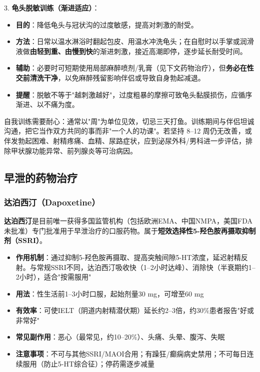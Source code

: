 \documentclass[12pt,a4paper,twoside]{ctexbook}
\begin{document}
3. \textbf{龟头脱敏训练（渐进适应）}：
  \begin{itemize}
  \item \textbf{目的}：降低龟头与冠状沟的过度敏感，提高对刺激的耐受。
  \item \textbf{方法}：日常以温水淋浴时翻起包皮、用温水冲洗龟头；在自慰时以手掌或润滑液做\textbf{由轻到重、由慢到快}的渐进刺激，接近高潮即停，逐步延长耐受时间。
  \item \textbf{辅助}：必要时可短期使用局部麻醉喷剂/乳膏（见下文药物治疗），但\textbf{务必在性交前清洗干净}，以免麻醉残留影响伴侣或导致自身勃起减退。
  \item \textbf{提醒}：脱敏不等于"越刺激越好"，过度粗暴的摩擦可致龟头黏膜损伤，应循序渐进、以不痛为度。
  \end{itemize}

\begin{tcolorbox}[colback=pink!5!white,colframe=red!50!black,title=贴心小叮咛]
自我训练需要耐心：通常以"周"为单位见效，切忌三天打鱼。训练期间与伴侣坦诚沟通，把它当作双方共同的事而非"一个人的功课"。若坚持 8--12 周仍无改善，或伴发勃起困难、射精疼痛、血精、尿路症状，应到泌尿外科/男科进一步评估，排除甲状腺功能异常、前列腺炎等可治病因。
\end{tcolorbox}

\subsection{早泄的药物治疗}

\subsubsection{达泊西汀（Dapoxetine）}

\textbf{达泊西汀}是目前唯一获得多国监管机构（包括欧洲EMA、中国NMPA，美国FDA未批准）专门批准用于早泄治疗的口服药物。属于\textbf{短效选择性5-羟色胺再摄取抑制剂（SSRI）}。

\begin{itemize}[leftmargin=2cm]
	\item \textbf{作用机制}：通过抑制5-羟色胺再摄取、提高突触间隙5-HT浓度，延迟射精反射。与常规SSRI不同，达泊西汀吸收快（1--2小时达峰）、消除快（半衰期约1--2小时），适合"按需服用"
	\item \textbf{用法}：性生活前1--3小时口服，起始剂量30 mg，可增至60 mg
	\item \textbf{有效率}：可使IELT（阴道内射精潜伏期）延长约2--3倍，约30\%患者报告"好或非常好"
	\item \textbf{常见副作用}：恶心（最常见，约10--20\%）、头痛、头晕、腹泻、失眠
	\item \textbf{注意事项}：不可与其他SSRI/MAOI合用；有躁狂/癫痫病史禁用；不可每日连续服用（防止5-HT综合征）；停药需逐步减量
\end{itemize}
\end{document}
